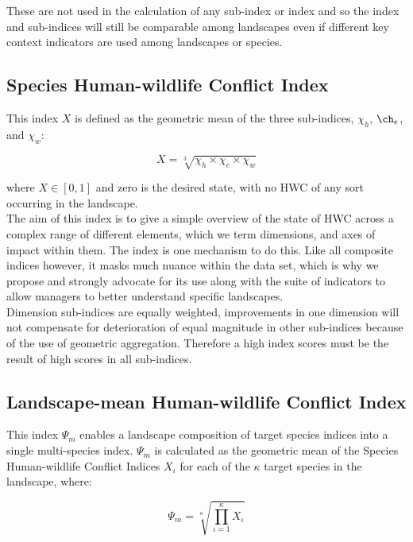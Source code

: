 \documentclass[fleqn,10pt]{olplainarticle}
\begin{document}
These are not used in the calculation of any sub-index or index and so the index and sub-indices will still be comparable among landscapes even if different key context indicators are used among landscapes or species.\\

\subsection*{Species Human-wildlife Conflict Index}
This index $X$ is defined as the geometric mean of the three sub-indices, $\chi_h$, $\ch_e$, and $\chi_w$:

\begin{equation*}
    X = \sqrt[3]{\chi_h \times \chi_e \times \chi_w}
\end{equation*}

where $X \in [0,1]$ and zero is the desired state, with no HWC of any sort occurring in the landscape.\\

The aim of this index is to give a simple overview of the state of HWC across a complex range of different elements, which we term dimensions, and axes of impact within them. The index is one mechanism to do this. Like all composite indices however, it masks much nuance within the data set, which is why we propose and strongly advocate for its use along with the suite of indicators to allow managers to better understand specific landscapes.\\

Dimension sub-indices are equally weighted, improvements in one dimension will not compensate for deterioration of equal magnitude in other sub-indices because of the use of geometric aggregation. Therefore a high index scores must be the result of high scores in all sub-indices.\\

\subsection*{Landscape-mean Human-wildlife Conflict Index}
This index $\Psi_m$ enables a landscape composition of target species indices into a single multi-species index. $\Psi_m$ is calculated as the geometric mean of the Species Human-wildlife Conflict Indices $X_\iota$ for each of the $\kappa$ target species in the landscape, where:

\begin{equation*}
    \Psi_m = \sqrt[\kappa]{\prod_{\iota=1}^{\kappa} X_\iota }
\end{equation*}
\end{document}
